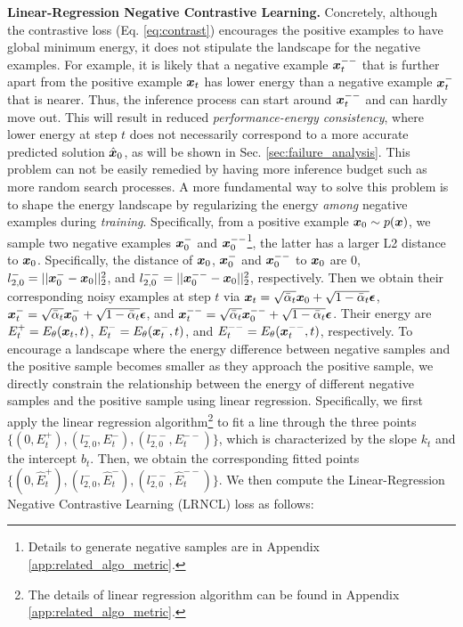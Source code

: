 \textbf{Linear-Regression Negative Contrastive Learning.} Concretely, although the contrastive loss (Eq. \ref{eq:contrast}) encourages the positive examples to have global minimum energy, it does not stipulate the landscape for the negative examples. For example, it is likely that a negative example ${\boldsymbol{x}}_t^{--}$ that is further apart from the positive example ${\boldsymbol{x}}_t$ has lower energy than a negative example ${\boldsymbol{x}}_t^{-}$ that is nearer. Thus, the inference process can start around ${\boldsymbol{x}}_t^{--}$ and can hardly move out. This will result in reduced \emph{performance-energy consistency}, where lower energy at step $t$ does not necessarily correspond to a more accurate predicted solution $\hat{{\boldsymbol{x}}}_0$, as will be shown in Sec. \ref{sec:failure_analysis}. This problem can not be easily remedied by having more inference budget such as more random search processes. A more fundamental way to solve this problem is to shape the energy landscape by regularizing the energy \emph{among} negative examples during \emph{training}. Specifically, from a positive example ${\boldsymbol{x}}_0\sim p({\boldsymbol{x}})$, we sample two negative examples ${\boldsymbol{x}}_0^{-}$ and ${\boldsymbol{x}}_0^{--}$\footnote{Details to generate negative samples are in Appendix \ref{app:related_algo_metric}.}, the latter has a larger L2 distance to ${\boldsymbol{x}}_0$. Specifically, the distance of ${\boldsymbol{x}}_0$, ${\boldsymbol{x}}_0^{-}$ and ${\boldsymbol{x}}_0^{--}$ to ${\boldsymbol{x}}_0$ are $0$, $l_{2,0}^-=||{\boldsymbol{x}}_0^{-}-{\boldsymbol{x}}_0||_2^2$, and $l_{2,0}^{--}=||{\boldsymbol{x}}_0^{--}-{\boldsymbol{x}}_0||_2^2$, respectively. Then we obtain their corresponding noisy examples at step $t$ via ${\boldsymbol{x}}_t=\sqrt{\bar{\alpha}_t}{\boldsymbol{x}}_0+\sqrt{1-\bar{\alpha}_t}{\boldsymbol{\epsilon}}$, ${\boldsymbol{x}}_t^-=\sqrt{\bar{\alpha}_t}{\boldsymbol{x}}_0^-+\sqrt{1-\bar{\alpha}_t}{\boldsymbol{\epsilon}}$, and ${\boldsymbol{x}}_t^{--}=\sqrt{\bar{\alpha}_t}{\boldsymbol{x}}_0^{--}+\sqrt{1-\bar{\alpha}_t}{\boldsymbol{\epsilon}}$. Their energy are $E^+_t=E_\theta({\boldsymbol{x}}_t,t)$, $E^-_t=E_\theta({\boldsymbol{x}}_t^-,t)$, and $E^{--}_t=E_\theta({\boldsymbol{x}}_t^{--},t)$, respectively. To encourage a landscape where the energy difference between negative samples and the positive sample becomes smaller as they approach the positive sample, we directly constrain the relationship between the energy of different negative samples and the positive sample using linear regression. Specifically, we first apply the linear regression algorithm\footnote{The details of linear regression algorithm can be found in Appendix \ref{app:related_algo_metric}.} to fit a line through the three points \(\{(0, E_t^+), (l_{2,0}^{-}, E_t^{-}), (l_{2,0}^{--}, E_t^{--})\}\), which is characterized by the slope \(k_t\) and the intercept \(b_t\). Then, we obtain the corresponding fitted points \(\{(0, \hat{E}_t^+), (l_{2,0}^{-}, \hat{E}_t^{-}), (l_{2,0}^{--}, \hat{E}_t^{--})\}\). We then compute the Linear-Regression Negative Contrastive Learning (LRNCL) loss as follows:

